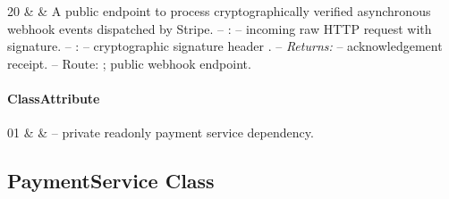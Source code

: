 \begin{ClassMethodTable}
20 & \newline{} &
A public endpoint to process cryptographically verified asynchronous webhook events dispatched by Stripe.
\newline -- :  -- incoming raw HTTP request with signature.
\newline -- :  -- cryptographic signature header .
\newline -- \textit{Returns:}  -- acknowledgement receipt.
\newline -- Route: ; public webhook endpoint. \\ \hline
\end{ClassMethodTable}

\paragraph{ClassAttribute}
\begin{ClassAttributeTable}
01 &  &  -- private readonly payment service dependency. \\ \hline
\end{ClassAttributeTable}

\subsection{PaymentService Class}

